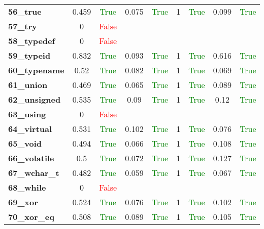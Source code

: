 \documentclass{article}
\begin{document}
\begin{xltabular}{\textwidth}{lcccccccc}
\textbf{56\_true}& 0.459&\textcolor{green}{True}& 0.075&\textcolor{green}{True}& 1&\textcolor{green}{True}& 0.099&\textcolor{green}{True} \\[0.5ex]
\textbf{57\_try}& 0&\textcolor{red}{False} \\[0.5ex]
\textbf{58\_typedef}& 0&\textcolor{red}{False} \\[0.5ex]
\textbf{59\_typeid}& 0.832&\textcolor{green}{True}& 0.093&\textcolor{green}{True}& 1&\textcolor{green}{True}& 0.616&\textcolor{green}{True} \\[0.5ex]
\textbf{60\_typename}& 0.52&\textcolor{green}{True}& 0.082&\textcolor{green}{True}& 1&\textcolor{green}{True}& 0.069&\textcolor{green}{True} \\[0.5ex]
\textbf{61\_union}& 0.469&\textcolor{green}{True}& 0.065&\textcolor{green}{True}& 1&\textcolor{green}{True}& 0.089&\textcolor{green}{True} \\[0.5ex]
\textbf{62\_unsigned}& 0.535&\textcolor{green}{True}& 0.09&\textcolor{green}{True}& 1&\textcolor{green}{True}& 0.12&\textcolor{green}{True} \\[0.5ex]
\textbf{63\_using}& 0&\textcolor{red}{False} \\[0.5ex]
\textbf{64\_virtual}& 0.531&\textcolor{green}{True}& 0.102&\textcolor{green}{True}& 1&\textcolor{green}{True}& 0.076&\textcolor{green}{True} \\[0.5ex]
\textbf{65\_void}& 0.494&\textcolor{green}{True}& 0.066&\textcolor{green}{True}& 1&\textcolor{green}{True}& 0.108&\textcolor{green}{True} \\[0.5ex]
\textbf{66\_volatile}& 0.5&\textcolor{green}{True}& 0.072&\textcolor{green}{True}& 1&\textcolor{green}{True}& 0.127&\textcolor{green}{True} \\[0.5ex]
\textbf{67\_wchar\_t}& 0.482&\textcolor{green}{True}& 0.059&\textcolor{green}{True}& 1&\textcolor{green}{True}& 0.067&\textcolor{green}{True} \\[0.5ex]
\textbf{68\_while}& 0&\textcolor{red}{False} \\[0.5ex]
\textbf{69\_xor}& 0.524&\textcolor{green}{True}& 0.076&\textcolor{green}{True}& 1&\textcolor{green}{True}& 0.102&\textcolor{green}{True} \\[0.5ex]
\textbf{70\_xor\_eq}& 0.508&\textcolor{green}{True}& 0.089&\textcolor{green}{True}& 1&\textcolor{green}{True}& 0.105&\textcolor{green}{True} \\[0.5ex]
\bottomrule
\end{xltabular}
\newpage
\end{document}
